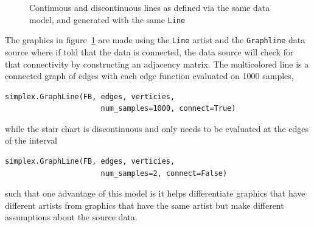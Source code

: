 \documentclass[journal]{vgtc}                %
\begin{document}
\begin{figure}[htb]
  \centering 
\caption{Continuous and discontinuous lines as defined via the same data model, and generated with the same \vartisteq \texttt{Line}}
\label{fig:code:multilines}
\end{figure}
The graphics in figure~\ref{fig:code:multilines} are made using the \texttt{Line} artist and the \texttt{Graphline} data source where if told that the data is connected, the data source will check for that connectivity by constructing an adjacency matrix. The multicolored line is a connected graph of edges with each edge function evaluated on 1000 samples, 
\begin{verbatim}
simplex.GraphLine(FB, edges, verticies, 
                      num_samples=1000, connect=True)
\end{verbatim}
while the stair chart is discontinuous and only needs to be evaluated at the edges of the interval 
\begin{verbatim}
simplex.GraphLine(FB, edges, verticies, 
                      num_samples=2, connect=False)
\end{verbatim}
such that one advantage of this model is it helps differentiate graphics that have different artists from graphics that have the same artist but make different assumptions about the source data. 
\end{document}
